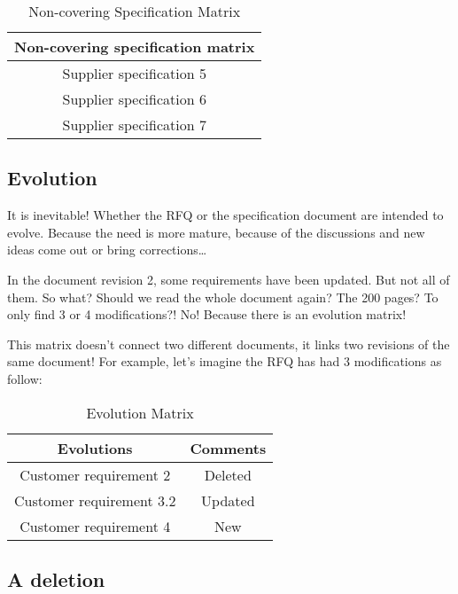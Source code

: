 \begin{table*}
	\centering
		\begin{tabular}{|c|}
			\hline
			Non-covering specification matrix\\
            \hline
            Supplier specification 5\\
            \hline
            Supplier specification 6\\
            \hline
            Supplier specification 7\\
            \hline
		\end{tabular}
	\caption{Non-covering Specification Matrix}
	\label{tab:NonCoveringSpecificationMatrix}
\end{table*}

\subsection{Evolution}
It is inevitable! Whether the RFQ or the specification document are intended to evolve. Because the need is more mature, because of the discussions and new ideas come out or bring corrections…

In the document revision 2, some requirements have been updated. But not all of them. So what? Should we read the whole document again? The 200 pages? To only find 3 or 4 modifications?! No! Because there is an evolution matrix!

This matrix doesn’t connect two different documents, it links two revisions of the same document! For example, let’s imagine the RFQ has had 3 modifications as follow:

\begin{table*}
	\centering
		\begin{tabular}{|c|c|}
			\hline
			Evolutions & Comments\\
            \hline
            Customer requirement 2 & Deleted\\
            \hline
            Customer requirement 3.2 & Updated\\
            \hline
            Customer requirement 4 & New\\
            \hline
		\end{tabular}
	\caption{Evolution Matrix}
	\label{tab:EvolutionMatrix}
\end{table*}

\subsection{A deletion}


